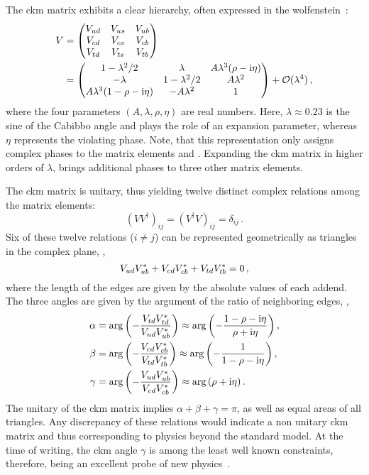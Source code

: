 The \gls{ckm} matrix exhibits a clear hierarchy, often expressed in the \gls{wolfenstein}~\cite{wolfenstein}:
\begin{align*}
    V &= \begin{pmatrix} {\ensuremath{V_{{u}{d}}}} & {V_{{u}{s}}} & {V_{{u}{b}}} \\ {V_{{c}{d}}} & {V_{{c}{s}}} & {V_{{c}{b}}} \\ {V_{{t}{d}}} & {V_{{t}{s}}} & {V_{{t}{b}}} \end{pmatrix} \nonumber \\
    &= \begin{pmatrix} 1-\lambda^2/2 & \lambda & A \lambda^3 (\rho -\mathrm{i} \eta) \\ -\lambda & 1-\lambda^2/2 & A \lambda^2 \\ A \lambda^3 (1- \rho - \mathrm{i} \eta) & - A \lambda^2 & 1 \end{pmatrix} + \mathcal{O}(\lambda^4) \,,
\end{align*}
where the four parameters $(A, \lambda, \rho, \eta)$ are real numbers.
Here, $\lambda \approx 0.23$ is the sine of the Cabibbo angle and plays the role of an expansion parameter, whereas $\eta$ represents the \CP violating phase.
Note, that this representation only assigns complex phases to the matrix elements \Vub and \Vtd.
Expanding the \gls{ckm} matrix in higher orders of $\lambda$, brings additional phases to three other matrix elements.

The \gls{ckm} matrix is unitary, thus yielding twelve distinct complex relations among the matrix elements:
\begin{equation*}
   \left( V V^\dagger \right)_{ij} = \left( V^\dagger V \right)_{ij} = \delta_{ij} \,.
\end{equation*}
Six of these twelve relations ($i \neq j$) can be represented geometrically as triangles in the complex plane, \eg{},
\begin{equation*}
    {\ensuremath{V_{{u}{d}}}} {\ensuremath{V_{{u}{b}}^\ast}} + {V_{{c}{d}}} {V_{{c}{b}}^\ast} + {V_{{t}{d}}} {V_{{t}{b}}^\ast} = 0 \,,
\end{equation*}
where the length of the edges are given by the absolute values of each addend.
The three angles are given by the argument of the ratio of neighboring edges, \ie{},
\begin{align*}
    \alpha &= \arg \left( - \frac{{V_{{t}{d}}} {V_{{t}{d}}^\ast}}{{V_{{u}{d}}} {V_{{u}{b}}^\ast}} \right) \approx \arg \left( - \frac{1-\rho-\mathrm{i} \eta}{\rho + \mathrm{i} \eta} \right), \\
    \beta &= \arg \left( - \frac{{V_{{c}{d}}} {V_{{c}{b}}^\ast}}{{V_{{t}{d}}} {V_{{t}{b}}^\ast}} \right) \approx \arg \left( - \frac{1}{1-\rho-\mathrm{i} \eta} \right), \\
    \gamma &= \arg \left( - \frac{{V_{{u}{d}}} {V_{{u}{b}}^\ast}}{{V_{{c}{d}}} {V_{{c}{b}}^\ast}} \right) \approx \arg \left( \rho + \mathrm{i} \eta \right).
\end{align*}
The unitary of the \gls{ckm} matrix implies $\alpha + \beta + \gamma = \pi$, as well as equal areas of all triangles.
Any discrepancy of these relations would indicate a non unitary \gls{ckm} matrix and thus corresponding to physics beyond the standard model.
At the time of writing, the \gls{ckm} angle $\gamma$ is among the least well known constraints, therefore, being an excellent probe of new physics~\cite{Browder2008,Ciuchini2011}. 


